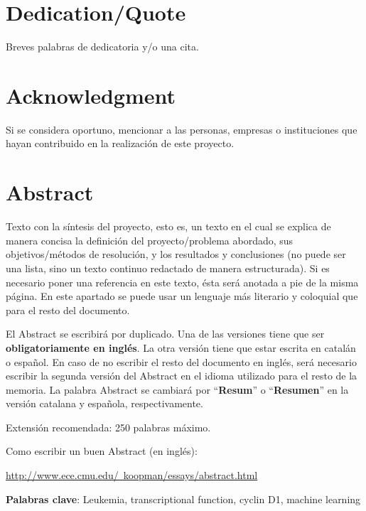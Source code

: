 \chapter*{Dedication/Quote}

Breves palabras de dedicatoria y/o una cita.

\chapter*{Acknowledgment}

Si se considera oportuno, mencionar a las personas, empresas o instituciones que hayan contribuido en la realización de este proyecto.

\chapter*{Abstract}

\onehalfspacing

Texto con la síntesis del proyecto, esto es, un texto en el cual se explica de manera concisa la definición del proyecto/problema abordado, sus objetivos/métodos de resolución, y los resultados y conclusiones (no puede ser una lista, sino un texto continuo redactado de manera estructurada). Si es necesario poner una referencia en este texto, ésta será anotada a pie de la misma página. En este apartado se puede usar un lenguaje más literario y coloquial que para el resto del documento.

El Abstract se escribirá por duplicado. Una de las versiones tiene que ser \textbf{obligatoriamente en inglés}. La otra versión tiene que estar escrita en catalán o español. En caso de no escribir el resto del documento en inglés, será necesario escribir la segunda versión del Abstract en el idioma utilizado para el resto de la memoria. La palabra Abstract se cambiará por ``\textbf{Resum}'' o ``\textbf{Resumen}'' en la versión catalana y española, respectivamente. 

Extensión recomendada: 250 palabras máximo.

Como escribir un buen Abstract (en inglés):

\href{http://www.ece.cmu.edu/~koopman/essays/abstract.html}{http://www.ece.cmu.edu/~koopman/essays/abstract.html}

\vspace{1.5cm}

\textbf{Palabras clave}: Leukemia, transcriptional function, cyclin D1, machine learning